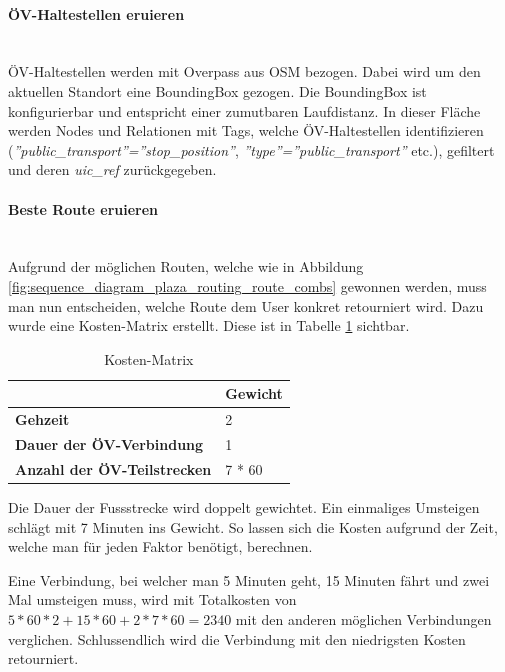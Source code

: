 \paragraph{ÖV-Haltestellen eruieren}\label{impl:Plaza Routing ÖV-Haltestellen eruieren}~\\
ÖV-Haltestellen werden mit Overpass \cite{wiki:overpass} aus \ac{OSM} bezogen. Dabei wird um den aktuellen Standort eine \gls{BoundingBox} gezogen. Die \gls{BoundingBox} ist konfigurierbar und entspricht einer zumutbaren Laufdistanz. In dieser Fläche werden \glspl{Node} und Relationen mit \glspl{Tag}, welche ÖV-Haltestellen identifizieren (\emph{''public\_transport''=''stop\_position''}, \emph{''type''=''public\_transport''} etc.), gefiltert und deren \emph{uic\_ref} zurückgegeben.

\paragraph{Beste Route eruieren}\label{impl:Plaza Routing Beste Route eruieren}~\\
Aufgrund der möglichen Routen, welche wie in Abbildung \ref{fig:sequence_diagram_plaza_routing_route_combs} gewonnen werden, muss man nun entscheiden, welche Route dem User konkret retourniert wird. Dazu wurde eine Kosten-Matrix erstellt. Diese ist in Tabelle \ref{table:cost-matrix} sichtbar.

\begin{table}[ht]
    \centering
    \begin{tabular}{l|l}
        & \textbf{Gewicht} \\ \hline
        \textbf{Gehzeit}                    & 2                \\
        \textbf{Dauer der ÖV-Verbindung}    & 1                \\
        \textbf{Anzahl der ÖV-Teilstrecken} & 7 * 60          
    \end{tabular}
    \caption{Kosten-Matrix}
    \label{table:cost-matrix}
\end{table}

Die Dauer der Fussstrecke wird doppelt gewichtet. Ein einmaliges Umsteigen schlägt mit 7 Minuten ins Gewicht. So lassen sich die Kosten aufgrund der Zeit, welche man für jeden Faktor benötigt, berechnen.

Eine Verbindung, bei welcher man 5 Minuten geht, 15 Minuten fährt und zwei Mal umsteigen muss, wird mit Totalkosten von $5 * 60 * 2 + 15 * 60 + 2 * 7 * 60 = 2340$ mit den anderen möglichen Verbindungen verglichen. Schlussendlich wird die Verbindung mit den niedrigsten Kosten retourniert.

